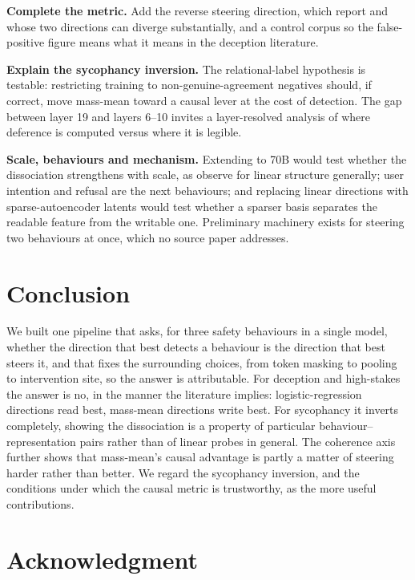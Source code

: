 \documentclass[conference]{IEEEtran}
\begin{document}
\textbf{Complete the metric.} Add the reverse steering direction, which
\citeauthor{marks2024} report and whose two directions can diverge substantially,
and a control corpus so the false-positive figure means what it means in the
deception literature.

\textbf{Explain the sycophancy inversion.} The relational-label hypothesis is
testable: restricting training to non-genuine-agreement negatives should, if
correct, move mass-mean toward a causal lever at the cost of detection. The gap
between layer 19 and layers 6--10 invites a layer-resolved analysis of where
deference is computed versus where it is legible.

\textbf{Scale, behaviours and mechanism.} Extending to 70B would test whether the
dissociation strengthens with scale, as \citeauthor{marks2024} observe for linear
structure generally; user intention and refusal are the next behaviours; and
replacing linear directions with sparse-autoencoder latents
\citep{cunningham2023,bricken2023} would test whether a sparser basis separates
the readable feature from the writable one. Preliminary machinery exists for
steering two behaviours at once, which no source paper addresses.

\section{Conclusion}

We built one pipeline that asks, for three safety behaviours in a single model,
whether the direction that best detects a behaviour is the direction that best
steers it, and that fixes the surrounding choices, from token masking to
pooling to intervention site, so the answer is attributable. For deception and
high-stakes the answer is no, in the manner the literature implies:
logistic-regression directions read best, mass-mean directions write best. For
sycophancy it inverts completely, showing the dissociation is a property of
particular behaviour--representation pairs rather than of linear probes in
general. The coherence axis further shows that mass-mean's causal advantage is
partly a matter of steering harder rather than better. We regard the sycophancy
inversion, and the conditions under which the causal metric is trustworthy, as the
more useful contributions.

\section*{Acknowledgment}
\end{document}
